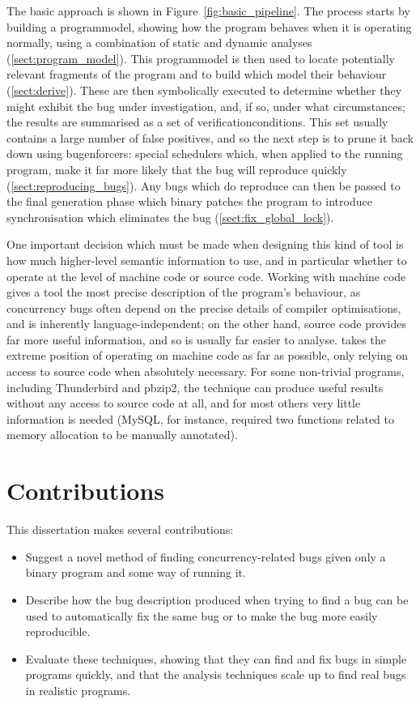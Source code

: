 The basic approach is shown in Figure~\ref{fig:basic_pipeline}.  The
process starts by building a \gls{programmodel}, showing how the
program behaves when it is operating normally, using a combination of
static and dynamic analyses (\autoref{sect:program_model}).  This
\gls{programmodel} is then used to locate potentially relevant
fragments of the program and to build {\StateMachines} which model
their behaviour (\autoref{sect:derive}).  These {\StateMachines} are
then symbolically executed to determine whether they might exhibit the
bug under investigation, and, if so, under what circumstances; the
results are summarised as a set of \glspl{verificationcondition}.
This set usually contains a large number of false positives, and so
the next step is to prune it back down using \glspl{bugenforcer}:
special schedulers which, when applied to the running program, make it
far more likely that the bug will reproduce quickly
(\autoref{sect:reproducing_bugs}).  Any bugs which do reproduce can
then be passed to the final {\genfix} generation phase which binary
patches the program to introduce synchronisation which eliminates the
bug (\autoref{sect:fix_global_lock}).

One important decision which must be made when designing this kind of
tool is how much higher-level semantic information to use, and in
particular whether to operate at the level of machine code or source
code.  Working with machine code gives a tool the most precise
description of the program's behaviour, as concurrency bugs often
depend on the precise details of compiler optimisations, and is
inherently language-independent; on the other hand, source code
provides far more useful information, and so is usually far easier to
analyse.  {\Technique} takes the extreme position of operating on
machine code as far as possible, only relying on access to source code
when absolutely necessary.  For some non-trivial programs, including
Thunderbird and pbzip2, the technique can produce useful results
without any access to source code at all, and for most others very
little information is needed (MySQL, for instance, required two
functions related to memory allocation to be manually annotated).

\section{Contributions}

This dissertation makes several contributions:

\begin{itemize}
\item
  Suggest a novel method of finding concurrency-related bugs given
  only a binary program and some way of running it.
\item
  Describe how the bug description produced when trying to find a bug
  can be used to automatically fix the same bug or to make the bug
  more easily reproducible.
\item
  Evaluate these techniques, showing that they can find and fix bugs
  in simple programs quickly, and that the analysis techniques scale
  up to find real bugs in realistic programs.
\end{itemize}

